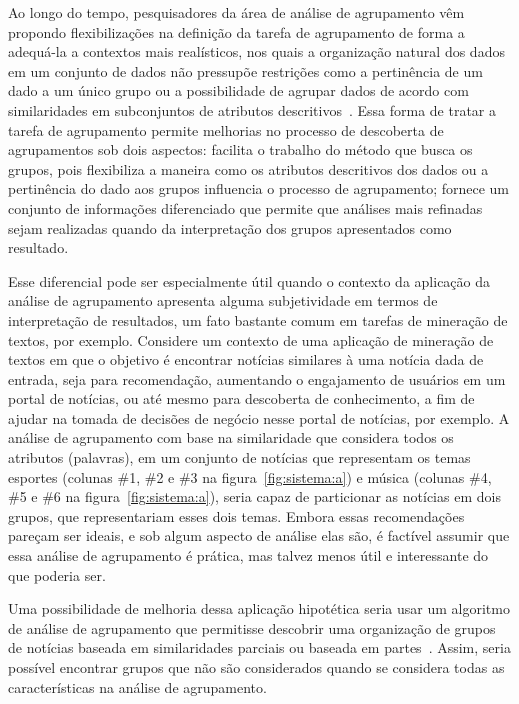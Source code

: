 \documentclass[
    12pt,                %
    oneside,            %
    a4paper,            %
    english,            %
    brazil                %
    ]{abntex2ppgsi}
\begin{document}
Ao longo do tempo, pesquisadores da área de análise de agrupamento vêm propondo flexibilizações na definição da tarefa de agrupamento de forma a adequá-la a contextos mais realísticos, nos quais a organização natural dos dados em um conjunto de dados não pressupõe restrições como a pertinência de um dado a um único grupo ou a possibilidade de agrupar dados de acordo com similaridades em subconjuntos de atributos descritivos~\cite{Bezdek1981,Han2011,Peres2012}.
Essa forma de tratar a tarefa de agrupamento permite melhorias no processo de descoberta de agrupamentos sob dois aspectos: facilita o trabalho do método que busca os grupos, pois flexibiliza a maneira como os atributos descritivos dos dados ou a pertinência do dado aos grupos influencia o processo de agrupamento; fornece um conjunto de informações diferenciado que permite que análises mais refinadas sejam realizadas quando da interpretação dos grupos apresentados como resultado.

Esse diferencial pode ser especialmente útil quando o contexto da aplicação da análise de agrupamento apresenta alguma subjetividade em termos de interpretação de resultados, um fato bastante comum em tarefas de mineração de textos, por exemplo.
Considere um contexto de uma aplicação de mineração de textos em que o objetivo é encontrar notícias similares à uma notícia dada de entrada, seja para recomendação, aumentando o engajamento de usuários em um portal de notícias, ou até mesmo para descoberta de conhecimento, a fim de ajudar na tomada de decisões de negócio nesse portal de notícias, por exemplo.
A análise de agrupamento com base na similaridade que considera todos os atributos (palavras), em um conjunto de notícias que representam os temas esportes (colunas \#1, \#2 e \#3 na figura~\ref{fig:sistema:a}) e música (colunas \#4, \#5 e \#6 na figura~\ref{fig:sistema:a}), seria capaz de particionar as notícias em dois grupos, que representariam esses dois temas.
Embora essas recomendações pareçam ser ideais, e sob algum aspecto de análise elas são, é factível assumir que essa análise de agrupamento é prática, mas talvez menos útil e interessante do que poderia ser.

Uma possibilidade de melhoria dessa aplicação hipotética seria usar um algoritmo de análise de agrupamento que permitisse descobrir uma organização de grupos de notícias baseada em similaridades parciais ou baseada em partes~\cite{Franca2010,Ho2008}.
Assim, seria possível encontrar grupos que não são considerados quando se considera todas as características na análise de agrupamento.
\end{document}
